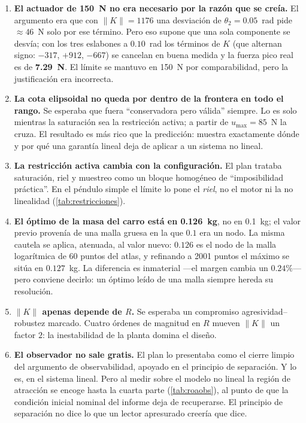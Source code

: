 \documentclass[11pt,letterpaper]{article}
\theoremstyle{definition}
\theoremstyle{plain}
\theoremstyle{remark}
\begin{document}
\begin{enumerate}
  \item \textbf{El actuador de 150~N no era necesario por la razón que se
  creía.} El argumento era que con $\|K\|=1176$ una desviación de
  $\theta_2=0.05$~rad pide $\approx46$~N solo por ese término. Pero eso supone
  que una sola componente se desvía; con los tres eslabones a $0.10$~rad los
  términos de $K$ (que alternan signo: $-317$, $+912$, $-667$) se cancelan en
  buena medida y la fuerza pico real es de \textbf{7.29~N}. El límite se mantuvo
  en 150~N por comparabilidad, pero la justificación era incorrecta.

  \item \textbf{La cota elipsoidal no queda por dentro de la frontera en todo el
  rango.} Se esperaba que fuera ``conservadora pero válida'' siempre. Lo es solo
  mientras la saturación sea la restricción activa; a partir de
  $u_{\max}=85$~N la cruza. El resultado es más rico que la predicción: muestra
  exactamente dónde y por qué una garantía lineal deja de aplicar a un sistema
  no lineal.

  \item \textbf{La restricción activa cambia con la configuración.} El plan
  trataba saturación, riel y muestreo como un bloque homogéneo de
  ``imposibilidad práctica''. En el péndulo simple el límite lo pone el
  \emph{riel}, no el motor ni la no linealidad (\cref{tab:restricciones}).

  \item \textbf{El óptimo de la masa del carro está en 0.126~kg}, no en 0.1~kg;
  el valor previo provenía de una malla gruesa en la que $0.1$ era un nodo. La
  misma cautela se aplica, atenuada, al valor nuevo: $0.126$ es el nodo de la
  malla logarítmica de 60 puntos del atlas, y refinando a 2001 puntos el máximo
  se sitúa en $0.127$~kg. La diferencia es inmaterial ---el margen cambia un
  $0.24\%$--- pero conviene decirlo: un óptimo leído de una malla siempre hereda
  su resolución.

  \item \textbf{$\|K\|$ apenas depende de $R$.} Se esperaba un compromiso
  agresividad--robustez marcado. Cuatro órdenes de magnitud en $R$ mueven
  $\|K\|$ un factor $2$: la inestabilidad de la planta domina el diseño.

  \item \textbf{El observador no sale gratis.} El plan lo presentaba como el
  cierre limpio del argumento de observabilidad, apoyado en el principio de
  separación. Y lo es, en el sistema lineal. Pero al medir sobre el modelo no
  lineal la región de atracción se encoge hasta la cuarta parte
  (\cref{tab:roaobs}), al punto de que la condición inicial nominal del informe
  deja de recuperarse. El principio de separación no dice lo que un lector
  apresurado creería que dice.
\end{enumerate}
\end{document}
